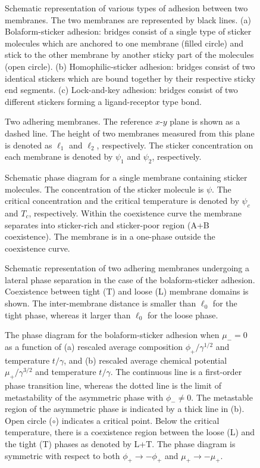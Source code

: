 \newpage
\begin{figure}
\caption{
Schematic representation of various types of adhesion between 
two membranes.
The two membranes are represented by black lines.
(a) Bolaform-sticker adhesion:
bridges consist of a single type of sticker molecules
which are anchored to one membrane (filled circle) and stick
to the other membrane by another sticky part of the molecules
(open circle).
(b) Homophilic-sticker adhesion: bridges consist of two
identical stickers which are
bound together by their respective sticky end segments.
(c) Lock-and-key adhesion: bridges consist of two different 
stickers forming a ligand-receptor type bond.
}
\label{figtype}
\end{figure}


\begin{figure}
\caption{
Two adhering membranes.
The reference $x$-$y$ plane is shown as a dashed line.
The height of two membranes measured from this plane is
denoted as $\ell_1$ and
$\ell_2$, respectively.
The sticker concentration on each membrane is denoted by
$\psi_1$ and
$\psi_2$, respectively.
}
\label{figmem}
\end{figure}


\begin{figure}
\caption{
Schematic phase diagram for a single membrane containing sticker
molecules.
The concentration of the sticker molecule is $\psi$.
The critical concentration and the critical temperature is denoted
by $\psi_c$ and $T_c$, respectively.
Within the coexistence curve the membrane separates
into sticker-rich and sticker-poor region (A+B coexistence).
The membrane is in a one-phase outside the coexistence curve.
}
\label{figphase}
\end{figure}


\begin{figure}
\caption{
Schematic representation of two adhering membranes undergoing
a lateral phase separation in the
case of the bolaform-sticker adhesion.
Coexistence between  tight (T) and loose (L) membrane domains is shown.
The inter-membrane distance is smaller than $\ell_0$
for the tight phase, whereas it larger than $\ell_0$
for the loose phase.
}
\label{figsym}
\end{figure}


\begin{figure}
\caption{
The phase diagram for the bolaform-sticker adhesion when $\mu_-=0$
as a function of (a) rescaled average composition
$\phi_+/\gamma^{1/2}$ and temperature $t/\gamma$, and (b) rescaled average
chemical potential $\mu_+/\gamma^{3/2}$ and temperature $t/\gamma$.
The continuous line is a first-order phase transition line, whereas the
dotted line is the limit of metastability of the asymmetric phase
with $\phi_- \neq 0$.
The metastable region of the asymmetric phase is indicated by a thick
line in (b).
Open circle ($\circ$) indicates a critical point.
Below the critical temperature, there is a coexistence region between
the loose (L) and the tight (T) phases as denoted by L+T.
The phase diagram is symmetric with respect to both
$\phi_+ \rightarrow -\phi_+$ and $\mu_+ \rightarrow -\mu_+$.
}
\label{figphasesym}
\end{figure}


